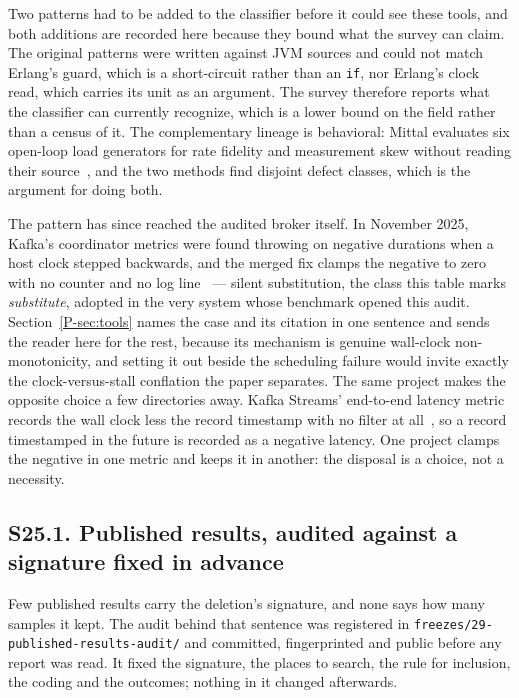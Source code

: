 \documentclass[10pt,journal,onecolumn]{IEEEtran}
\newcommand{\mainTools}{\ref{P-sec:tools}}                %
\begin{document}
Two patterns had to be added to the classifier before it could see these tools, and both
additions are recorded here because they bound what the survey can claim. The original
patterns were written against JVM sources and could not match Erlang's guard, which is a
short-circuit rather than an \texttt{if}, nor Erlang's clock read, which carries its unit as
an argument. The survey therefore reports what the classifier can currently recognize, which
is a lower bound on the field rather than a census of it. The complementary lineage is behavioral: Mittal evaluates six open-loop load generators for rate fidelity and measurement skew without reading their source~\cite{mittal2025}, and the two methods find disjoint defect classes, which is the argument for doing both.

The pattern has since reached the audited broker itself. In November 2025, Kafka's
coordinator metrics were found throwing on negative durations when a host clock stepped
backwards, and the merged fix clamps the negative to zero with no counter and no log
line~\cite{kafka19888} --- silent substitution, the class this table marks
\emph{substitute}, adopted in the very system whose benchmark opened this audit. Section~\mainTools{} names the case and its citation in one sentence and sends the reader here for the rest,
because its mechanism is genuine wall-clock non-monotonicity, and setting it out beside
the scheduling failure would invite exactly the clock-versus-stall conflation the paper separates.
The same project makes the opposite choice a few directories away. Kafka Streams' end-to-end
latency metric records the wall clock less the record timestamp with no filter at
all~\cite{kafka_streams_e2e}, so a record timestamped in the future is recorded as a negative
latency. One project clamps the negative in one metric and keeps it in another: the disposal
is a choice, not a necessity.


\subsection{S25.1. Published results, audited against a signature fixed in advance}
\label{sec:reach}

Few published results carry the deletion's signature, and none says how many samples it kept.
The audit behind that sentence was registered in \texttt{freezes/29-published-results-audit/}
and committed, fingerprinted and public before any report was read. It fixed the signature, the
places to search, the rule for inclusion, the coding and the outcomes; nothing in it changed
afterwards.
\end{document}
